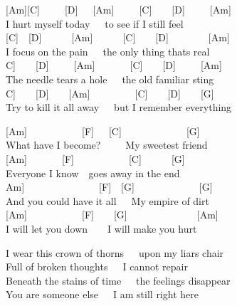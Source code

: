 \documentclass[
  letterpaper,
  twoside=false]{scrbook}
\begin{document}
{[}Am{]}{[}C{]}~~~~~{[}D{]}~~~{[}Am{]}~~~~~{[}C{]}~~~~{[}D{]}~~~~~{[}Am{]}\\
\hspace*{0.333em}\hspace*{0.333em}\hspace*{0.333em}I hurt myself
today~~~to see if I still feel\\
{[}C{]}~~{[}D{]}~~~~~~{[}Am{]}~~~~~~{[}C{]}~~~~{[}D{]}~~~~~~~~{[}Am{]}\\
I focus on the pain~~~the only thing that\textquotesingle s real\\
\hspace*{0.333em}\hspace*{0.333em}\hspace*{0.333em}{[}C{]}~~~~{[}D{]}~~~~~{[}Am{]}~~~~~~~{[}C{]}~~~~{[}D{]}~~~~~{[}Am{]}\\
The needle tears a hole~~~the old familiar sting\\
\hspace*{0.333em}\hspace*{0.333em}\hspace*{0.333em}\hspace*{0.333em}\hspace*{0.333em}\hspace*{0.333em}{[}C{]}~~~~{[}D{]}~~~~{[}Am{]}~~~~~~~~~{[}C{]}~~~~{[}D{]}~~~~{[}G{]}~~~~~~~~~\\
Try to kill it all away~~~but I remember everything

{[}Am{]}~~~~~~~~~~~{[}F{]}~~~{[}C{]}~~~~~~~~~~~~~{[}G{]}\\
What have I become?~~~~~My sweetest friend\\
{[}Am{]}~~~~~~~{[}F{]}~~~~~~~~~~~{[}C{]}~~~~~~{[}G{]}\\
Everyone I know~~goes away in the end\\
\hspace*{0.333em}\hspace*{0.333em}\hspace*{0.333em}{[}Am{]}~~~~~~~~~~~~~~~{[}F{]}~~{[}G{]}~~~~~~~~~~~~~{[}G{]}\\
And you could have it all~~~My empire of dirt\\
{[}Am{]}~~~~~~~~~~~{[}F{]}~~~~{[}G{]}~~~~~~~~~~~~~~{[}Am{]}\\
I will let you down~~~~I will make you hurt

I wear this crown of thorns~~~upon my liar\textquotesingle s chair\\
Full of broken thoughts~~~I cannot repair\\
Beneath the stains of time~~~the feelings disappear\\
You are someone else~~~I am still right here
\end{document}
